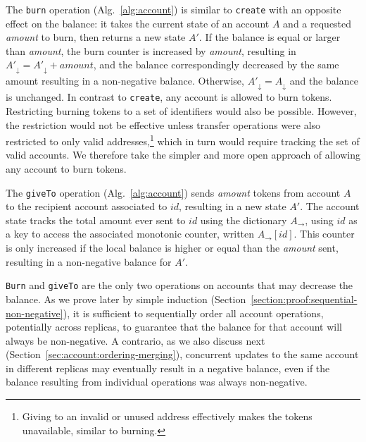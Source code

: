 \documentclass[9pt]{article}   	%
\begin{document}
The \texttt{burn} operation (Alg.~\ref{alg:account}) is similar to \texttt{create} with an opposite effect on the balance: it takes the current state of an account $A$ and a requested \textit{amount} to burn, then returns a new state $A'$. If the balance is equal or larger than \textit{amount}, the burn counter is increased by \textit{amount}, resulting in $A'_\downarrow = A'_\downarrow + \textit{amount}$, and the balance correspondingly decreased by the same amount resulting in a non-negative balance. Otherwise, $A'_\downarrow = A_\downarrow$ and the balance is unchanged. In contrast to \texttt{create}, any account is allowed to burn tokens. Restricting burning tokens to a set of identifiers would also be possible. However, the restriction would not be effective unless transfer operations were also restricted to only valid addresses,\footnote{Giving to an invalid or unused address effectively makes the tokens unavailable, similar to burning.} which in turn would require tracking the set of valid accounts. We therefore take the simpler and more open approach of allowing any account to burn tokens. 

The \texttt{giveTo} operation (Alg.~\ref{alg:account}) sends \textit{amount} tokens from account $A$ to the recipient account associated to $id$, resulting in a new state $A'$. The account state tracks the total amount ever sent to $id$ using the dictionary $A_{\rightarrow}$, using $id$ as a key to access the associated monotonic counter, written $A_{\rightarrow}[id]$. This counter is only increased if the local balance is higher or equal than the \textit{amount} sent, resulting in a non-negative balance for $A'$.

\texttt{Burn} and \texttt{giveTo} are the only two operations on accounts that may decrease the balance. As we prove later by simple induction (Section~\ref{section:proof:sequential-non-negative}), it is sufficient to sequentially order all account operations, potentially across replicas, to guarantee that the balance for that account will always be non-negative. A contrario, as we also discuss next  (Section~\ref{sec:account:ordering-merging}), concurrent updates to the same account in different replicas may eventually result in a negative balance, even if the balance resulting from individual operations was always non-negative.
\end{document}
